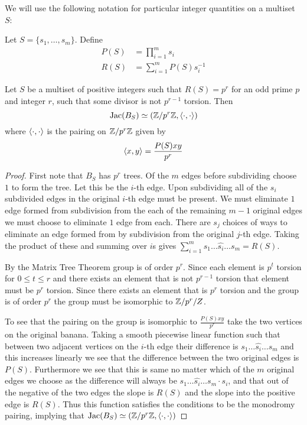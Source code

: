 \documentclass{amsart}
\begin{document}
We will use the following notation for particular integer quantities
on a multiset $S$:
\begin{defn}
  Let $S = \{s_1, \ldots, s_m\}$. Define
  \begin{align*}
    P(S) &= \prod_{i=1}^ms_i\\
    R(S) &= \sum_{i=1}^mP(S)s_i^{-1}
  \end{align*}
\end{defn}

\begin{prop}
  \label{prop:banana_pairing}
  Let $S$ be a multiset of positive integers such that $R(S) = p^r$ for an odd prime $p$ and integer $r$, such that some divisor is not $p^{r-1}$ torsion. Then 
  \begin{equation*}
    \operatorname{Jac}(B_S) \simeq (\mathbb{Z}/p^r\mathbb{Z}, \langle \cdot, \cdot \rangle)
  \end{equation*}
  where $\langle \cdot, \cdot \rangle$ is the pairing on $\mathbb{Z}/p^r\mathbb{Z}$ given by
  \begin{equation*}
    \langle x, y \rangle = \frac{P(S)xy}{p^r}
  \end{equation*}
\end{prop}
\begin{proof}
 First note that $B_{S}$ has $p^r$ trees. Of the $m$ edges before subdividing choose $1$ to form the tree. Let this be the $i$-th edge. Upon subdividing all of the $s_{i}$ subdivided edges in the original $i$-th edge must be present. We must eliminate $1$ edge formed from subdivision from the each of the remaining $m-1$ original edges we must choose to eliminate $1$ edge from each. There are $s_{j}$ choices of ways to eliminate an edge formed from by subdivision from the original $j$-th edge. Taking the product of these and summing over $i$s gives $\sum^{m}_{i=1}s_{1}\dots \hat{s_{i}} \dots s_{m}=R(S)$.
 
 By the Matrix Tree Theorem group is of order $p^{r}$. Since each element is $p^{t}$ torsion for $0\le t\le r$ and there exists an element that is not $p^{r-1}$ torsion that element must be $p^{r}$ torsion. Since there exists an element that is $p^r$ torsion and the group is of order $p^r$ the group must be isomorphic to $\mathbb{Z}/p^{r}/Z$.
 
 To see that the pairing on the group is isomorphic to $\frac{P(S)xy}{p^r}$ take the two vertices on the original banana. Taking a smooth piecewise linear function such that between two adjacent vertices on the $i$-th edge their difference is $s_{1}\dots \hat{s_{i}} \dots s_{m}$ and this increases linearly we see that the difference between the two original edges is $P(S)$. Furthermore we see that this is same no matter which of the $m$ original edges we choose as the difference will always be $s_{1}\dots \hat{s_{i}} \dots s_{m}\cdot s_{i}$, and that out of the negative of the two edges the slope is $R(S)$ and the slope into the positive edge is $R(S)$. Thus this function satisfies the conditions to be the monodromy pairing, implying that $\operatorname{Jac}(B_S) \simeq (\mathbb{Z}/p^r\mathbb{Z}, \langle \cdot, \cdot \rangle)$
\end{proof}
\end{document}
